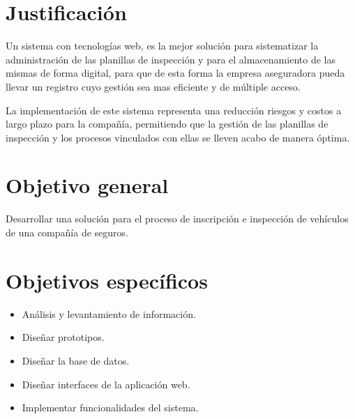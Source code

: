 \setlength{\parskip}{0mm}




\section{Justificación}


Un sistema con tecnologías web, es la mejor solución para sistematizar la administración de las planillas de inspección y para el almacenamiento de las mismas de forma digital, para que de esta forma la empresa aseguradora pueda llevar un registro cuyo gestión sea mas eficiente y de múltiple acceso.

La implementación de este sistema representa una reducción riesgos y costos a largo plazo para la compañía, permitiendo que la gestión de las planillas de inspección y los procesos vinculados con ellas se lleven acabo de manera óptima.


\section{Objetivo general}

Desarrollar una solución para el proceso de inscripción e inspección de vehículos de una compañía de seguros.

\section{Objetivos específicos}

\begin{itemize}

	
	
	\item Análisis y levantamiento de información.

	\item Diseñar prototipos.

	\item Diseñar la base de datos.

	\item Diseñar interfaces de la aplicación web.

	\item Implementar funcionalidades del sistema.
	
	

\end{itemize}



